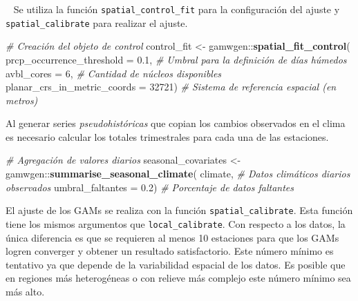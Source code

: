 \documentclass[
  12pt]{article}
\newenvironment{Shaded}{}{}
\newcommand{\CommentTok}[1]{\textcolor[rgb]{0.38,0.63,0.69}{\textit{#1}}}
\newcommand{\DataTypeTok}[1]{\textcolor[rgb]{0.56,0.13,0.00}{#1}}
\newcommand{\DecValTok}[1]{\textcolor[rgb]{0.25,0.63,0.44}{#1}}
\newcommand{\FloatTok}[1]{\textcolor[rgb]{0.25,0.63,0.44}{#1}}
\newcommand{\KeywordTok}[1]{\textcolor[rgb]{0.00,0.44,0.13}{\textbf{#1}}}
\newcommand{\NormalTok}[1]{#1}
\newcommand{\OperatorTok}[1]{\textcolor[rgb]{0.40,0.40,0.40}{#1}}
\newcommand{\StringTok}[1]{\textcolor[rgb]{0.25,0.44,0.63}{#1}}
\begin{document}
~
Se utiliza la función \texttt{spatial\_control\_fit} para la configuración del ajuste y \texttt{spatial\_calibrate} para realizar el ajuste.

\begin{Shaded}
\begin{Highlighting}[]
\CommentTok{# Creación del objeto de control}
\NormalTok{control_fit <-}\StringTok{ }\NormalTok{gamwgen}\OperatorTok{::}\KeywordTok{spatial_fit_control}\NormalTok{(}
  \DataTypeTok{prcp_occurrence_threshold =} \FloatTok{0.1}\NormalTok{, }
  \CommentTok{# Umbral para la definición de días húmedos}
  \DataTypeTok{avbl_cores =} \DecValTok{6}\NormalTok{, }
  \CommentTok{# Cantidad de núcleos disponibles}
  \DataTypeTok{planar_crs_in_metric_coords =} \DecValTok{32721}\NormalTok{) }
\CommentTok{# Sistema de referencia espacial (en metros)}
\end{Highlighting}
\end{Shaded}

Al generar series \emph{pseudohistóricas} que copian los cambios observados en el clima es necesario calcular los totales trimestrales para cada una de las estaciones.

\begin{Shaded}
\begin{Highlighting}[]
\CommentTok{# Agregación de valores diarios }
\NormalTok{seasonal_covariates <-}\StringTok{ }\NormalTok{gamwgen}\OperatorTok{::}\KeywordTok{summarise_seasonal_climate}\NormalTok{(}
\NormalTok{  climate,}
  \CommentTok{# Datos climáticos diarios observados}
  \DataTypeTok{umbral_faltantes =} \FloatTok{0.2}\NormalTok{)}
  \CommentTok{# Porcentaje de datos faltantes}
\end{Highlighting}
\end{Shaded}

El ajuste de los GAMs se realiza con la función \texttt{spatial\_calibrate}. Esta función tiene los mismos argumentos que \texttt{local\_calibrate}. Con respecto a los datos, la única diferencia es que se requieren al menos 10 estaciones para que los GAMs logren converger y obtener un resultado satisfactorio. Este número mínimo es tentativo ya que depende de la variabilidad espacial de los datos. Es posible que en regiones más heterogéneas o con relieve más complejo este número mínimo sea más alto.
\end{document}
